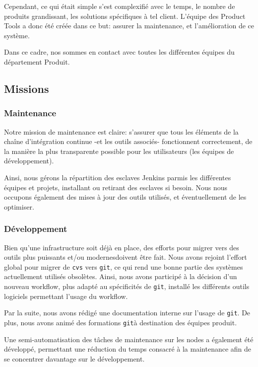 \documentclass[a4paper, 12pt]{article}
\newcommand{\git}{\texttt{git}}
\begin{document}
Cependant, ce qui était simple s'est complexifié avec le temps, le nombre de produits grandissant, les solutions spécifiques à tel client. L'équipe des Product Tools a donc été créée dans ce but: assurer la maintenance, et l'amélioration de ce système.

Dans ce cadre, nos sommes en contact avec toutes les différentes équipes du département Produit.

\subsection{Missions}
\subsubsection{Maintenance}

Notre mission de maintenance est claire: s'assurer que tous les éléments de la chaîne d'intégration continue -et les outils associés- fonctionnent correctement, de la manière la plus transparente possible pour les utilisateurs (les équipes de développement).

Ainsi, nous gérons la répartition des esclaves Jenkins parmis les différentes équipes et projets, installant ou retirant des esclaves si besoin. Nous nous occupons également des mises à jour des outils utilisés, et éventuellement de les optimiser.

\subsubsection{Développement}

Bien qu'une infrastructure soit déjà en place, des efforts pour migrer vers des outils plus puissants et/ou modernesdoivent être fait. Nous avons rejoint l'effort global pour migrer de \texttt{cvs} vers \git, ce qui rend une bonne partie des systèmes actuellement utilisés obsolètes. Ainsi, nous avons participé à la décision d'un nouveau workflow, plus adapté au spécificités de \git, installé les différents outils logiciels permettant l'usage du workflow.

Par la suite, nous avons rédigé une documentation interne sur l'usage de \git. De plus, nous avons animé des formations \git à destination des équipes produit.

Une semi-automatisation des tâches de maintenance sur les nodes a également été développé, permettant une réduction du temps consacré à la maintenance afin de se concentrer davantage sur le développement.
\end{document}
